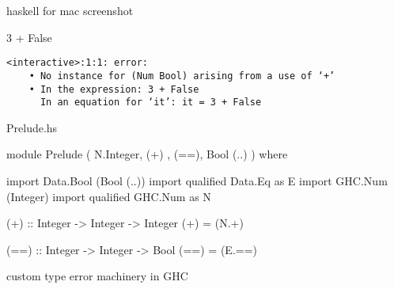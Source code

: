 
\begin{frame}

haskell for mac screenshot
\end{frame}


\begin{frame}[fragile]

\Large
\begin{texttt}
3 + False
\end{texttt}
\nl

\large
\begin{block}{}
\begin{Verbatim}
<interactive>:1:1: error:
    • No instance for (Num Bool) arising from a use of ‘+’
    • In the expression: 3 + False
      In an equation for ‘it’: it = 3 + False
\end{Verbatim}
\end{block}
\end{frame}


\begin{frame}[fragile]

\begin{block}{Prelude.hs}
\begin{haskellcode}
module Prelude
  ( N.Integer, (+)
  , (==), Bool (..)
  )
where

import Data.Bool (Bool (..))
import qualified Data.Eq as E
import GHC.Num (Integer)
import qualified GHC.Num as N

(+) :: Integer -> Integer -> Integer
(+) = (N.+)

(==) :: Integer -> Integer -> Bool
(==) = (E.==)
\end{haskellcode}
\end{block}
\end{frame}



\begin{frame}

custom type error machinery in GHC

\end{frame}

